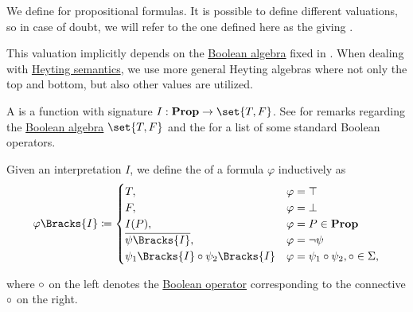 \begin{definition}\label{def:propositional_valuation}
  We define  for propositional formulas. It is possible to define different valuations, so in case of doubt, we will refer to the one defined here as the  giving .

  This valuation implicitly depends on the \hyperref[def:boolean_algebra]{Boolean algebra} fixed in . When dealing with \hyperref[def:propositional_heyting_algebra_semantics]{Heyting semantics}, we use more general Heyting algebras where not only the top and bottom, but also other values are utilized.

  \begin{thmenum}
     A  is a function with signature \( I: \boldop{Prop} \to \set{ T, F } \). See  for remarks regarding the \hyperref[def:boolean_algebra]{Boolean algebra} \( \set{ T, F } \) and the  for a list of some standard Boolean operators.

     Given an interpretation \( I \), we define the  of a formula \( \varphi \) inductively as
    \begin{equation}\label{eq:def:propositional_valuation/formula_interpretation}
      \varphi\Bracks{I} \coloneqq \begin{cases}
        T,                                         &\varphi = \top \\
        F,                                         &\varphi = \bot \\
        I(P),                                      &\varphi = P \in \boldop{Prop} \\
        \overline{\psi\Bracks{I}},                 &\varphi = \neg \psi \\
        \psi_1\Bracks{I} \bincirc \psi_2\Bracks{I} &\varphi = \psi_1 \bincirc \psi_2, \bincirc \in \Sigma,
      \end{cases}
    \end{equation}
  \end{thmenum}
  where \( \bincirc \) on the left denotes the \hyperref[def:standard_boolean_operators]{Boolean operator} corresponding to the connective \( \bincirc \) on the right.
\end{definition}

